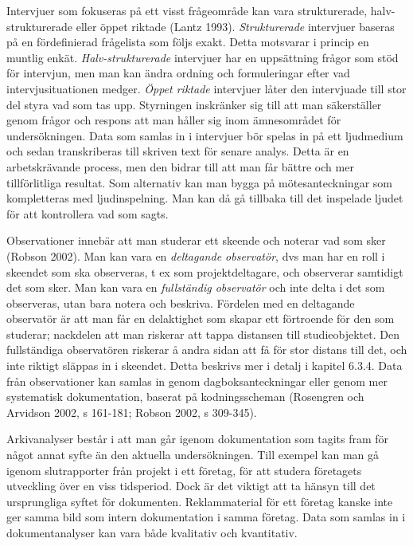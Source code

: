 Intervjuer som fokuseras på ett visst frågeområde kan vara
strukturerade, halv-strukturerade eller öppet riktade (Lantz 1993).
\emph{Strukturerade} intervjuer baseras på en fördefinierad frågelista
som följs exakt. Detta motsvarar i princip en muntlig enkät.
\emph{Halv-strukturerade} intervjuer har en uppsättning frågor som stöd
för intervjun, men man kan ändra ordning och formuleringar efter vad
intervjusituationen medger. \emph{Öppet riktade} intervjuer låter den
intervjuade till stor del styra vad som tas upp. Styrningen inskränker
sig till att man säkerställer genom frågor och respons att man håller
sig inom ämnesområdet för undersökningen. Data som samlas in i
intervjuer bör spelas in på ett ljudmedium och sedan transkriberas till
skriven text för senare analys. Detta är en arbetskrävande process, men
den bidrar till att man får bättre och mer tillförlitliga resultat. Som
alternativ kan man bygga på mötesanteckningar som kompletteras med
ljudinspelning. Man kan då gå tillbaka till det inspelade ljudet för att
kontrollera vad som sagts.

Observationer innebär att man studerar ett skeende och noterar vad som
sker (Robson 2002). Man kan vara en \emph{deltagande observatör}, dvs
man har en roll i skeendet som ska observeras, t ex som
projektdeltagare, och observerar samtidigt det som sker. Man kan vara en
\protect\hypertarget{OLE_LINK6}{}{\protect\hypertarget{OLE_LINK5}{}{}}\emph{fullständig
observatör} och inte delta i det som observeras, utan bara notera och
beskriva. Fördelen med en deltagande observatör är att man får en
delaktighet som skapar ett förtroende för den som studerar; nackdelen
att man riskerar att tappa distansen till studieobjektet. Den
fullständiga observatören riskerar å andra sidan att få för stor distans
till det, och inte riktigt släppas in i skeendet. Detta beskrivs mer i
detalj i kapitel 6.3.4. Data från observationer kan samlas in genom
dagboksanteckningar eller genom mer systematisk dokumentation, baserat
på kodningsscheman (Rosengren och Arvidson 2002, s 161-181; Robson 2002,
s 309-345).

Arkivanalyser består i att man går igenom dokumentation som tagits fram
för något annat syfte än den aktuella undersökningen. Till exempel kan
man gå igenom slutrapporter från projekt i ett företag, för att studera
företagets utveckling över en viss tidsperiod. Dock är det viktigt att
ta hänsyn till det ursprungliga syftet för dokumenten. Reklammaterial
för ett företag kanske inte ger samma bild som intern dokumentation i
samma företag. Data som samlas in i dokumentanalyser kan vara både
kvalitativ och kvantitativ.

